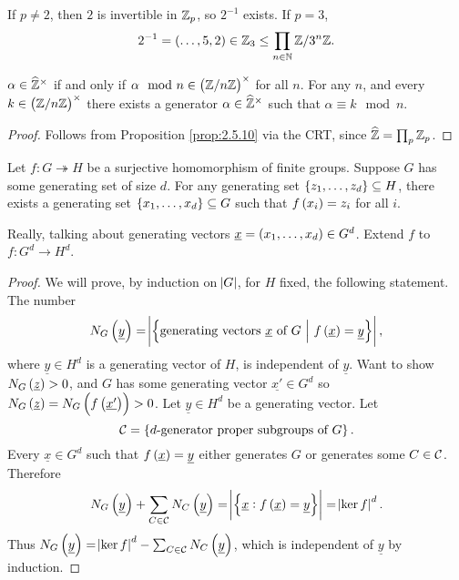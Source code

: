 \pagebreak

\begin{example}
If $ p \ne 2 $, then $ 2 $ is invertible in $ \mathbb{Z}_p $, so $ 2^{-1} $ exists. If $ p = 3 $,
$$ 2^{-1} = \br{\dots, 5, 2} \in \ZZ_3 \le \prod_{n \in \NN} \ZZ / 3^n\ZZ. $$
\end{example}

\begin{proposition}
$ \alpha \in \widehat{\mathbb{Z}}^\times $ if and only if $ \alpha \mod n \in \br{\ZZ / n\ZZ}^\times $ for all $ n $. For any $ n $, and every $ k \in \br{\ZZ / n\ZZ}^\times $ there exists a generator $ \alpha \in \widehat{\mathbb{Z}}^\times $ such that $ \alpha \equiv k \mod n $.
\end{proposition}

\begin{proof}
Follows from Proposition \ref{prop:2.5.10} via the CRT, since $ \widehat{\mathbb{Z}} = \prod_p \mathbb{Z}_p $.
\end{proof}

\begin{theorem}
Let $ f : G \twoheadrightarrow H $ be a surjective homomorphism of finite groups. Suppose $ G $ has some generating set of size $ d $. For any generating set $ \cbr{z_1, \dots, z_d} \subseteq H $, there exists a generating set $ \cbr{x_1, \dots, x_d} \subseteq G $ such that $ f\br{x_i} = z_i $ for all $ i $.
\end{theorem}

Really, talking about generating vectors $ \underline{x} = \br{x_1, \dots, x_d} \in G^d $. Extend $ f $ to $ f : G^d \to H^d $.

\begin{proof}
We will prove, by induction on $ \abs{G} $, for $ H $ fixed, the following statement. The number
$$ N_G\br{\underline{y}} = \abs{\cbr{\text{generating vectors} \ \underline{x} \ \text{of} \ G \st f\br{\underline{x}} = \underline{y}}}, $$
where $ \underline{y} \in H^d $ is a generating vector of $ H $, is independent of $ \underline{y} $. Want to show $ N_G\br{\underline{z}} > 0 $, and $ G $ has some generating vector $ \underline{x'} \in G^d $ so $ N_G\br{\underline{z}} = N_G\br{f\br{\underline{x'}}} > 0 $. Let $ \underline{y} \in H^d $ be a generating vector. Let
$$ \CCC = \cbr{\text{$ d $-generator proper subgroups of} \ G}. $$
Every $ \underline{x} \in G^d $ such that $ f\br{\underline{x}} = \underline{y} $ either generates $ G $ or generates some $ C \in \mathcal{C} $. Therefore
$$ N_G\br{\underline{y}} + \sum_{C \in \CCC} N_C\br{\underline{y}} = \abs{\cbr{\underline{x} : f\br{\underline{x}} = \underline{y}}} = \abs{\ker f}^d. $$
Thus $ N_G\br{\underline{y}} = \abs{\ker f}^d - \sum_{C \in \CCC} N_C\br{\underline{y}} $, which is independent of $ \underline{y} $ by induction.
\end{proof}

